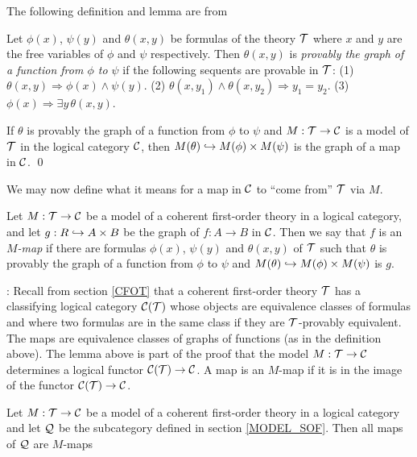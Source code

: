 The following definition and lemma are from \cite{MR} 

\begin{DEFN} Let $\phi(x)$, $\psi(y)$ and $\theta(x,y)$ be formulas 
of the theory $\cal T$ where $x$ and $y$ are the free variables of 
$\phi$ and $\psi$ respectively. Then $\theta(x,y)$ is {\em provably 
the graph of a function from $\phi$ to $\psi$} if the following 
sequents are provable in $\cal T$: (1) $\theta(x,y) \Rightarrow 
\phi(x) \wedge \psi(y)$. (2) $\theta(x,y_1) \wedge \theta(x,y_2) 
\Rightarrow y_1=y_2$. (3) $\phi(x) \Rightarrow \exists y \, 
\theta(x,y)$.
\end{DEFN}

\begin{lem}
If $\theta$ is provably the graph of a function from $\phi$ to $\psi$ 
and $M : \cal T \to {\bf \cal C}$ is a model of $\cal T$ in the logical 
category ${\bf \cal C}$, then $M(\theta) \hookrightarrow M(\phi) \times M(\psi)$ is the 
graph of a map in ${\bf \cal C}$. \qed \end{lem}

We may now define what it means for a map in ${\bf \cal C}$ to ``come from'' 
$\cal T$ via $M$.

\begin{DEFN}
Let $M : \cal T \to {\bf \cal C}$ be a model of a coherent first-order 
theory in a logical category, and let $g : R \hookrightarrow A \times B$ be the 
graph of $f : A \to B$ in ${\bf \cal C}$. Then we say that $f$ is an {\em 
$M$-map} if there are formulas $\phi(x)$, $\psi(y)$ and $\theta(x,y)$ 
of $\cal T$ such that $\theta$ is provably the graph of a function 
from $\phi$ to $\psi$ and $M(\theta) \hookrightarrow M(\phi) \times M(\psi)$ is 
$g$. \end{DEFN}

: Recall from section \ref{CFOT} that a coherent 
first-order theory $\cal T$ has a classifying logical category ${\bf \cal C} 
(\cal T)$ whose objects are equivalence classes of formulas and where 
two formulas are in the same class if they are $\cal T$-provably 
equivalent. The maps are equivalence classes of graphs of functions 
(as in the definition above). The lemma above is part of the proof 
that the model $M : \cal T \to {\bf \cal C}$ determines a logical functor 
${\bf \cal C} (\cal T) \to {\bf \cal C}$. A map is an $M$-map if it is in the image 
of the functor ${{\bf \cal C}}({\cal T}) \to {\bf \cal C}$. 

\begin{lem}
Let $M : \cal T \to {\bf \cal C}$ be a model of a coherent first-order 
theory in a logical category and let ${\bf \cal Q}$ be the subcategory 
defined in section \ref{MODEL_SOF}. Then all maps of ${\bf \cal Q}$ are 
$M$-maps \end{lem}

